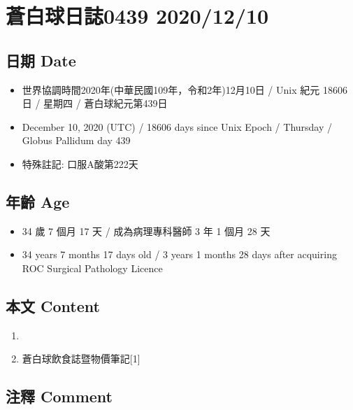 \documentclass[
]{article}
\providecommand{\tightlist}{%
  \setlength{\itemsep}{0pt}\setlength{\parskip}{0pt}}
\begin{document}
\hypertarget{ux84bcux767dux7403ux65e5ux8a8c0439-20201210}{%
\section{蒼白球日誌0439
2020/12/10}\label{ux84bcux767dux7403ux65e5ux8a8c0439-20201210}}

\hypertarget{ux65e5ux671f-date-9}{%
\subsection{日期 Date}\label{ux65e5ux671f-date-9}}

\begin{itemize}
\tightlist
\item
  世界協調時間2020年(中華民國109年，令和2年)12月10日 / Unix 紀元 18606
  日 / 星期四 / 蒼白球紀元第439日
\item
  December 10, 2020 (UTC) / 18606 days since Unix Epoch / Thursday /
  Globus Pallidum day 439
\item
  特殊註記: 口服A酸第222天
\end{itemize}

\hypertarget{ux5e74ux9f61-age-9}{%
\subsection{年齡 Age}\label{ux5e74ux9f61-age-9}}

\begin{itemize}
\tightlist
\item
  34 歲 7 個月 17 天 / 成為病理專科醫師 3 年 1 個月 28 天
\item
  34 years 7 months 17 days old / 3 years 1 months 28 days after
  acquiring ROC Surgical Pathology Licence
\end{itemize}

\hypertarget{ux672cux6587-content-9}{%
\subsection{本文 Content}\label{ux672cux6587-content-9}}

\begin{enumerate}
\def\labelenumi{\arabic{enumi}.}
\tightlist
\item
\item
  蒼白球飲食誌暨物價筆記{[}1{]}
\end{enumerate}

\hypertarget{ux6ce8ux91cb-comment-9}{%
\subsection{注釋 Comment}\label{ux6ce8ux91cb-comment-9}}
\end{document}
